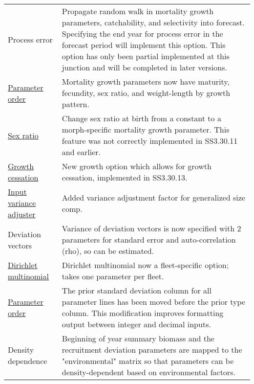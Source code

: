 \begin{center}
{\begin{longtable}{p{1.75cm} p{9.5cm}}
		\multicolumn{1}{l}{Process error} & 
				Propagate random walk in mortality growth parameters, catchability, and selectivity into forecast. Specifying the end year for process error in the forecast period will implement this option.  This option has only been partial implemented at this junction and will be completed in later versions.\\

		\multicolumn{1}{l}{\hyperlink{MGorder}{Parameter order}} & 
				Mortality growth parameters now have maturity, fecundity, sex ratio, and weight-length by growth pattern.\\
				
		\multicolumn{1}{l}{\hyperlink{SexRatio}{Sex ratio}} & 
			    Change sex ratio at birth from a constant to a morph-specific mortality growth parameter. This feature was not correctly implemented in SS3.30.11 and earlier. \\

		\multicolumn{1}{l}{\hyperlink{GrowthCessation}{Growth cessation}} & 
		    New growth option which allows for growth cessation, implemented in SS3.30.13. \\

		\multicolumn{1}{l}{\hyperlink{GcompVar}{Input variance adjuster}} & 
				Added variance adjustment factor for generalized size comp. \\
			
		\multicolumn{1}{l}{Deviation vectors} & 
				Variance of deviation vectors is now specified with 2 parameters for standard error and auto-correlation (rho), so can be estimated.\\
				
		\multicolumn{1}{l}{\hyperlink{Dirichlet}{Dirichlet multinomial}} & 
				Dirichlet multinomial now a fleet-specific option; takes one parameter per fleet. \\

		\multicolumn{1}{l}{\hyperlink{paraOrder}{Parameter order}} & The prior standard deviation column for all parameter lines has been moved before the prior type column.  This modification improves formatting output between integer and decimal inputs.\\ 

		\multicolumn{1}{l}{Density dependence} & 
				Beginning of year summary biomass and the recruitment deviation parameters are mapped to the "environmental" matrix so that parameters can be density-dependent based on environmental factors.\\
				

\end{longtable}}
\end{center}
